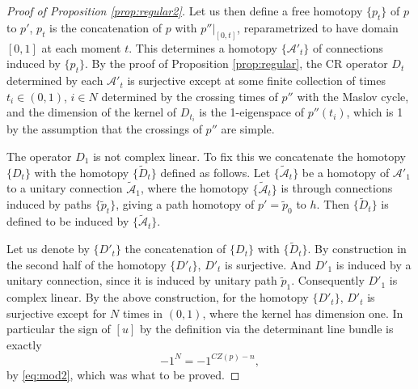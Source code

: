 \documentclass{amsart}
\numberwithin{equation}{section}
\theoremstyle{definition}
\theoremstyle{remark}
\begin{document}
\begin{proof}[Proof of Proposition \ref{prop:regular2}]
   Let us then define a free homotopy $\{p _{t} \}$ of $p$ to
$p'$, $p _{t} $ is the concatenation of $p$ with $p''| _{[0,t]} $,
reparametrized to have domain $[0,1]$ at each moment $t$. This
determines a homotopy $\{\mathcal{A}' _{t} \}$ of connections induced by $\{p
_{t} \}$. By the proof of Proposition \ref{prop:regular}, the CR operator $D _{t} $ determined by each  $\mathcal{A}' _{t} $ is surjective except at some finite collection of times $t _{i} \in (0,1) $, $i \in N$ determined by the crossing times of $p''$ with the Maslov cycle, and the dimension of the kernel
of $D _{t _{i} } $ is the 1-eigenspace of $p'' (t _{i} )$, which is 1
by the assumption that the crossings of $p''$ are simple. 
   
 The operator
$D _{1} $ is not complex linear. To fix this we concatenate the homotopy $\{D _{t} \}$ with the homotopy $\{\widetilde{D} _{t}  \}$ defined as follows. Let $\{\widetilde{\mathcal{A}} _{t}  \}$ be a homotopy of $\mathcal{A}' _{1} $ to a
unitary connection $\widetilde{\mathcal{A}} _{1}  $, where the homotopy
$\{\widetilde{\mathcal{A}} _{t}  \}$ is through connections induced by paths
$\{\widetilde{p} _{t} \} $, giving a path homotopy of $p'= \widetilde{p} _{0}  $ to $h$. 
Then $\{\widetilde{D} _{t}  \}$ is defined to be induced by $\{\widetilde{\mathcal{A}} _{t}  \}$.

Let us denote by $\{D' _{t} \}$ the
concatenation of $\{D _{t} \}$ with $\{ \widetilde{D} _{t}  \}$. By
construction in the second half of the homotopy $\{ {D}' _{t}
\}$, ${D}' _{t}  $ is surjective. And $D' _{1} $ is induced by a
unitary
connection, since it is induced by unitary path $\widetilde{p}_{1}  $.
Consequently $D' _{1} $ is complex linear. By the above construction,
for the homotopy $\{D' _{t} \}$, $D' _{t} $ is surjective except for
$N$ times in $(0,1)$, where the kernel has dimension one. 
In
particular the sign of $[u]$ by the definition via the determinant
line bundle is exactly $$-1^{N}= -1^{CZ (p) -n},$$
by \eqref{eq:mod2}, which was what to be proved.
\end {proof}
\end{document}
